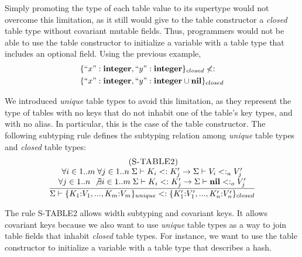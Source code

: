 \documentclass{sigplanconf}
\newcommand{\Nil}{\mathbf{nil}}
\newcommand{\Integer}{\mathbf{integer}}
\newcommand{\mylabel}[1]{\; (\textsc{#1})}
\newcommand{\senv}{\Sigma}
\newcommand{\subtype}{<:}
\begin{document}
Simply promoting the type of each table value to its supertype would
not overcome this limitation, as it still would give to the table constructor
a \emph{closed} table type without covariant mutable fields.
Thus, programmers would not be able to use the table constructor to
initialize a variable with a table type that includes an optional field.
Using the previous example,
\begin{align*}
& \{``x":\Integer, ``y":\Integer\}_{closed} \not\subtype \\
& \{``x":\Integer, ``y":\Integer \cup \Nil\}_{closed}
\end{align*}

We introduced \emph{unique} table types to avoid this limitation,
as they represent the type of tables with no keys that do not
inhabit one of the table's key types, and with no alias.
In particular, this is the case of the table constructor.
The following subtyping rule defines the subtyping relation among
\emph{unique} table types and \emph{closed} table types:
\[
\begin{array}{c}
\mylabel{S-TABLE2}\\
\dfrac{\begin{array}{c}
       \forall i \in 1..m \; \forall j \in 1..n \;
       \senv \vdash K_{i} \subtype K_{j}' \to \senv \vdash V_{i} \subtype_{u} V_{j}' \\
       \forall j \in 1..n \; \not\exists i \in 1..m \;
       \senv \vdash K_{i} \subtype K_{j}' \to \senv \vdash \Nil \subtype_{o} V_{j}'
       \end{array}}
      {\senv \vdash \{K_{1}{:}V_{1}, ..., K_{m}{:}V_{m}\}_{unique} \subtype
                    \{K_{1}'{:}V_{1}', ..., K_{n}'{:}V_{n}'\}_{closed}}
\end{array}
\]

The rule \textsc{S-TABLE2} allows width subtyping and covariant keys.
It allows covariant keys because we also want to use \emph{unique}
table types as a way to join table fields that inhabit \emph{closed} table types.
For instance, we want to use the table constructor to initialize
a variable with a table type that describes a hash.
\end{document}
